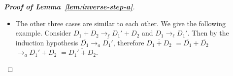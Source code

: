 \documentclass{LMCS}
\newcommand{\xto}[1]{\ensuremath{\rightarrow_{#1}}}
\newcommand{\tolinred}{\xto{\ell}}
\newcommand{\toalgred}{\xto{a}}
\begin{document}
\begin{proof}[\bf Proof of Lemma~\ref{lem:inverse-step-a}]
\begin{itemize}
\begin{itemize}
	\item The other three cases are similar to each other. We give the following
	  example. Consider $D_{1}+D_{2}\tolinred D_{1}'+D_{2}$ and $D_{1}\tolinred D_{1}'$.
	  Then by the induction hypothesis $\overline{D_{1}}\toalgred\overline{D_{1}'}$,
	  therefore 
	  $\overline{D_{1}+D_{2}}$
	  $=\overline{D_{1}}+\overline{D_{2}}$
	  $\toalgred\overline{D_{1}}'+\overline{D_{2}}$
	  $=\overline{D_{1}'+D_{2}}$.
	  \qedhere
      \end{itemize}
  \end{itemize}
\end{proof}
\end{document}
